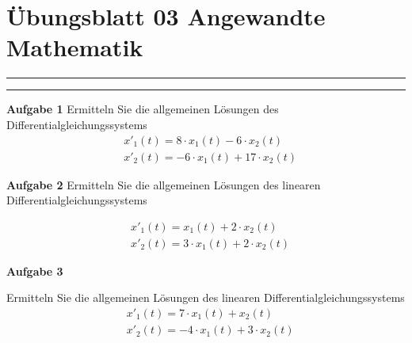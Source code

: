 \documentclass[a4paper,13pt]{scrartcl}
\begin{document}
\section*{\large  Übungsblatt 03 \hfill Angewandte Mathematik }
\hrule
\hrule
\vspace{4mm}

{\bf Aufgabe 1}
Ermitteln Sie die allgemeinen Lösungen  des  Differentialgleichungssystems
\begin{align*}
& x'_1(t) = 8 \cdot x_1(t) -6 \cdot x_2(t) \\
& x'_2(t) = -6 \cdot x_1(t) +17 \cdot x_2(t)
\end{align*}
\vspace{8mm}


{\bf Aufgabe 2}
Ermitteln Sie die allgemeinen Lösungen des linearen Differentialgleichungssystems

\begin{align*}
& x'_1(t) =  x_1(t) + 2 \cdot x_2(t) \\
& x'_2(t) =  3 \cdot x_1(t) +  2 \cdot x_2(t)
\end{align*}
\vspace{8mm}

\vspace{8mm}

{\bf Aufgabe 3}

Ermitteln Sie die allgemeinen Lösungen des  linearen Differentialgleichungssystems
\begin{align*}
& x'_1(t) =  7 \cdot x_1(t)  + x_2(t) \\
& x'_2(t) = -4 \cdot x_1(t) + 3 \cdot x_2(t)
\end{align*}
\end{document}
